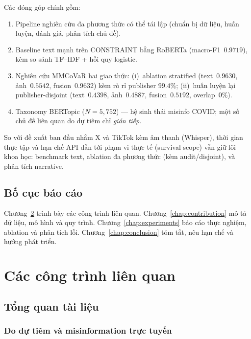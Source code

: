 \documentclass[12pt, a4paper]{report}
\begin{document}
Các đóng góp chính gồm:
\begin{enumerate}
  \item Pipeline nghiên cứu đa phương thức có thể tái lập (chuẩn bị dữ liệu, huấn luyện, đánh giá, phân tích chủ đề).
  \item Baseline text mạnh trên CONSTRAINT bằng RoBERTa (macro-F1~$0.9719$), kèm so sánh TF--IDF + hồi quy logistic.
  \item Nghiên cứu MMCoVaR hai giao thức: (i)~ablation stratified (text~$0.9630$, ảnh~$0.5542$, fusion~$0.9632$) kèm rò rỉ publisher $99.4\%$; (ii)~huấn luyện lại publisher-disjoint (text~$0.4398$, ảnh~$0.4887$, fusion~$0.5192$, overlap~$0\%$).
  \item Taxonomy BERTopic ($N=5{,}752$) --- hệ sinh thái misinfo COVID; một số chủ đề liên quan do dự tiêm chỉ \emph{gián tiếp}.
\end{enumerate}

So với đề xuất ban đầu nhắm X và TikTok kèm âm thanh (Whisper), thời gian thực tập và hạn chế API dẫn tới phạm vi thực tế (survival scope) vẫn giữ lõi khoa học: benchmark text, ablation đa phương thức (kèm audit/disjoint), và phân tích narrative.

\section{Bố cục báo cáo}
\label{sec:plan}

Chương~\ref{chap:related-works} trình bày các công trình liên quan.
Chương~\ref{chap:contribution} mô tả dữ liệu, mô hình và quy trình.
Chương~\ref{chap:experiments} báo cáo thực nghiệm, ablation và phân tích lỗi.
Chương~\ref{chap:conclusion} tóm tắt, nêu hạn chế và hướng phát triển.

\chapter{Các công trình liên quan}
\label{chap:related-works}

\section{Tổng quan tài liệu}
\label{sec:literature-review}

\subsection{Do dự tiêm và misinformation trực tuyến}
\end{document}
